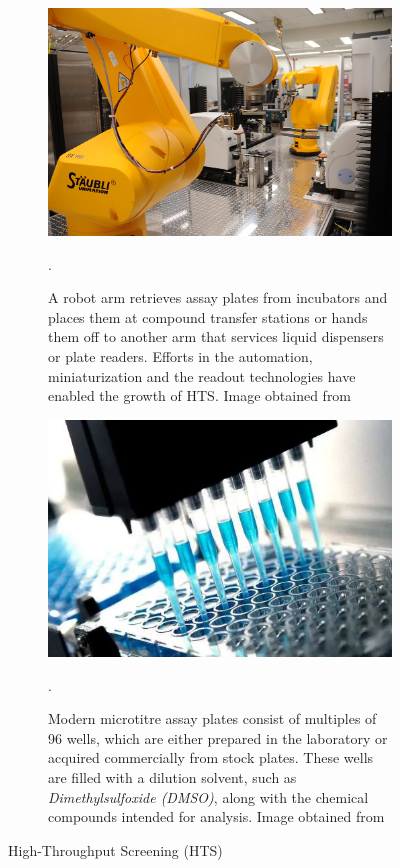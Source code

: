 \begin{figure}[htbp]
    \centering
    \begin{subfigure}[b]{0.48\textwidth}
        \centering
        \includegraphics[width=\textwidth]{figures/hts_robot.png}
        \caption{A robot arm retrieves assay plates from incubators and places them at compound transfer stations or hands them off to another arm that services liquid dispensers or plate readers. Efforts in the automation, miniaturization and the readout technologies have enabled the growth of HTS. Image obtained from~\cite{hts_robot}}.
        \label{fig:hts_robot}
    \end{subfigure}
    \hfill
    \begin{subfigure}[b]{0.48\textwidth}
        \centering
        \includegraphics[width=\textwidth]{figures/hts.png}
        \caption{Modern microtitre assay plates consist of multiples of 96 wells, which are either prepared in the laboratory or acquired commercially from stock plates. These wells are filled with a dilution solvent, such as \emph{Dimethylsulfoxide (DMSO)}, along with the chemical compounds intended for analysis. Image obtained from~\cite{hts_plates}}.
        \label{fig:hts_plates}
    \end{subfigure}
    \caption{High-Throughput Screening (HTS)}
    \label{fig:hts}
\end{figure}


